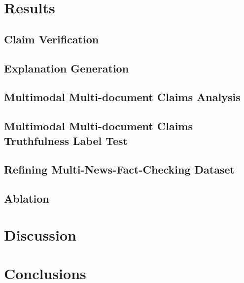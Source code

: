 \documentclass[doublespace,nopageskip]{VTthesis}
\begin{document}
    \chapter{Results} \label{ch:results}

        \section{Claim Verification} \label{se:CV}
            
        \section{Explanation Generation} \label{se:EG}
            
        \section{Multimodal Multi-document Claims Analysis} \label{se:MMCA}
            
        \section{Multimodal Multi-document Claims Truthfulness Label Test}
        \label{se:MMCT-Per}
            
        \section{Refining Multi-News-Fact-Checking Dataset} \label{se:RMNFCD}
            
        \section{Ablation} \label{se:ablation}
            

            
    \chapter{Discussion} \label{ch:discussion}
        
        
    \chapter{Conclusions} \label{ch:conclusions}
        

	
    
\end{document}
